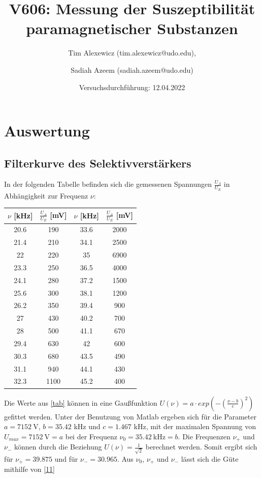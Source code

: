 \documentclass[a4paper]{scrartcl}
\begin{document}
\title{V606: Messung der Suszeptibilität paramagnetischer Substanzen}
\author{Tim Alexewicz (tim.alexewicz@udo.edu), \and Sadiah Azeem (sadiah.azeem@udo.edu)}
\date{Versuchsdurchführung: 12.04.2022}

\maketitle
\thispagestyle{empty}
\newpage
\thispagestyle{empty}
\tableofcontents
\newpage
\setcounter{page}{1}



\section{Auswertung}

\subsection{Filterkurve des Selektivverstärkers}
In der folgenden Tabelle befinden sich die gemessenen Spannungen $\frac{U_{A}}{U_{E}}$ in Abhängigkeit zur Frequenz $\nu$:
\begin{table}[H]
 \centering 
 \begin{tabular}{cccc} \toprule
 $\nu$ [kHz]& $\frac{U_{A}}{U_{E}}$ [mV] & $\nu$ [kHz]& $\frac{U_{A}}{U_{E}}$ [mV]\\  \midrule
 20.6 & 190 & 33.6 & 2000\\ 
 21.4 & 210 & 34.1 & 2500\\ 
 22 & 220 & 35 & 6900\\
 23.3 & 250 & 36.5 & 4000\\
 24.1 & 280 & 37.2 & 1500\\
 25.6 & 300 & 38.1 & 1200\\
 26.2 & 350 & 39.4 & 900\\
 27 & 430 & 40.2 & 700\\
 28 & 500 & 41.1 & 670\\
 29.4 & 630 & 42 & 600\\
 30.3 & 680 & 43.5 & 490\\
 31.1 & 940 & 44.1 & 430\\
 32.3 & 1100 & 45.2 & 400\\ \bottomrule
 \end{tabular} 
 \label{tab}
\end{table} 
Die Werte aus \autoref{tab} können in eine Gaußfunktion $U(\nu)=a\cdot exp(-(\frac{\nu-b}{c})^2)$ gefittet werden. Unter der Benutzung von Matlab ergeben sich für die Parameter $a=7152\ \si{\V}$, $b=35.42$ kHz und $c=1.467$ kHz, mit der maximalen Spannung von $U_{max}=7152\ \si{\V}=a$ bei der Frequenz $\nu_{0}=35.42\ \si{\kHz}=b$. Die Frequenzen $\nu_{+}$ und $\nu_{-}$ können durch die Beziehung $U(\nu)=\frac{1}{\sqrt{2}}$ berechnet werden. Somit ergibt sich für $\nu_{+}=39.875$ und für $\nu_{-}=30.965$. Aus $\nu_{0}$, $\nu_{+}$ und $\nu_{-}$ lässt sich die Güte mithilfe von \eqref{11}
\end{document}
